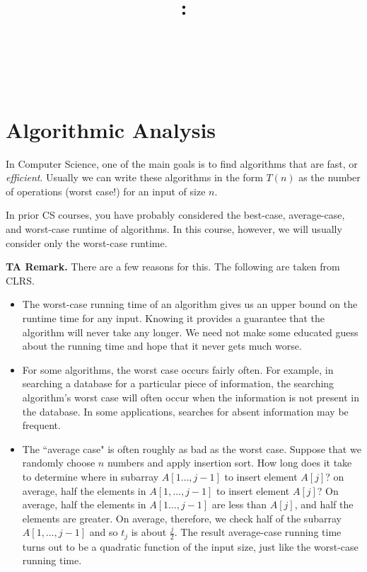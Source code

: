 \documentclass{article}
\title{
    \vspace{2in}
    \textbf{\lectClass:\\ \lectTitle}\\
    \vspace{0.1in}\large{\textit{\lectClassInstructor\ \lectSection}}
    \vspace{3in}
    \author{\textbf{\lectAuthorName}}
    \date{}
}
\begin{document}
\maketitle
\pagebreak

\section*{Algorithmic Analysis}
    In Computer Science, one of the main goals is to find algorithms that are fast, or \textit{efficient}. Usually we can write these algorithms in the form $T(n)$ as the number of operations (worst case!) for an input of size $n$.
    
    \vspace{1.5mm}
    In prior CS courses, you have probably considered the best-case, average-case, and worst-case runtime of algorithms. In this course, however, we will usually consider only the worst-case runtime.
    
    \vspace{1.5mm}\textbf{TA Remark.} There are a few reasons for this. The following are taken from CLRS. 
    \begin{itemize}
        \item The worst-case running time of an algorithm gives us an upper bound on the runtime time for any input. Knowing it provides a guarantee that the algorithm will never take any longer. We need not make some educated guess about the running time and hope that it never gets much worse.
        \item For some algorithms, the worst case occurs fairly often. For example, in searching a database for a particular piece of information, the searching algorithm's worst case will often occur when the information is not present in the database. In some applications, searches for absent information may be frequent.
        \item The ``average case" is often roughly as bad as the worst case. Suppose that we randomly choose $n$ numbers and apply insertion sort. How long does it take to determine where in subarray $A[1\dots, j - 1]$ to insert element $A[j]$? on average, half the elements in $A[1, \dots, j - 1]$ to insert element $A[j]$? On average, half the elements in $A[1\dots, j - 1]$ are less than $A[j]$, and half the elements are greater. On average, therefore, we check half of the subarray $A[1, \dots, j - 1]$ and so $t_{j}$ is about $\frac{j}{2}$. The result average-case running time turns out to be a quadratic function of the input size, just like the worst-case running time.
    \end{itemize}
    
\end{document}
